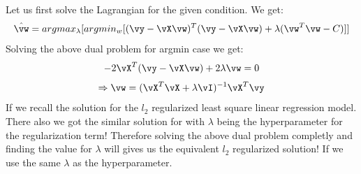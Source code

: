 \documentclass[a4paper,11pt]{article}
\begin{document}
\begin{mlsolution}

\noindent Let us first solve the Lagrangian for the given condition. We get:
\begin{equation}
  \hat\vw = argmax_{\lambda}[argmin_{w}[(\vy - \vX\vw)^{T}(\vy - \vX\vw) + \lambda(\vw^{T}\vw - C)]]
\end{equation}
Solving the above dual problem for argmin case we get:
\begin{equation}
  -2\vX^{T}(\vy - \vX\vw) + 2\lambda\vw = 0
\end{equation}
\begin{equation}
  \Rightarrow \vw = (\vX^{T}\vX + \lambda\vI)^{-1}\vX^{T}\vy
\end{equation}
If we recall the solution for the $l_{2}$ regularized least square linear regression model. There also we got the similar solution for with $\lambda$ being the hyperparameter for the regularization term! Therefore solving the above dual problem completly and finding the value for $\lambda$ will gives us the equivalent $l_{2}$ regularized solution! If we use the same $\lambda$ as the hyperparameter.


\end{mlsolution}
\end{document}
